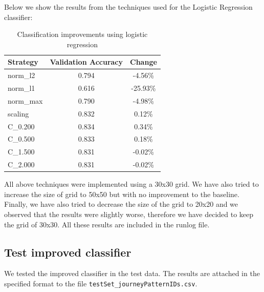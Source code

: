\documentclass[12pt]{article}
\begin{document}
Below we show the results from the techniques used for the Logistic Regression classifier:

\begin{table}[H]
	\centering
	\begin{tabular}{|l|c|c|}
		\hline
		\textbf{Strategy} & \textbf{Validation Accuracy} & \textbf{Change} \\ \hline
		norm\_l2 &  0.794  &  -4.56\%  \\ \hline
		norm\_l1 &  0.616  &  -25.93\%  \\ \hline
		norm\_max &  0.790  &  -4.98\%  \\ \hline
		scaling &  0.832  &  0.12\%  \\ \hline
		C\_0.200 &  0.834  &  0.34\%  \\ \hline
		C\_0.500 &  0.833  &  0.18\%  \\ \hline
		C\_1.500 &  0.831  &  -0.02\%  \\ \hline
		C\_2.000 &  0.831  &  -0.02\%  \\ \hline
	\end{tabular}
	\label{impr2}
	\caption{Classification improvements using logistic regression}
\end{table}

All above techniques were implemented using a 30x30 grid. We have also tried to increase the size of grid to 50x50 but with no improvement to the baseline. Finally, we have also tried to decrease the size of the grid to 20x20 and we observed that the results were slightly worse, therefore we have decided to keep the grid of 30x30. All these results are included in the runlog file.

	\subsection{Test improved classifier}
	
  We tested the improved classifier in the test data. The results are attached
  in the specified format to the file \texttt{testSet\_journeyPatternIDs.csv}.
	
\end{document}
